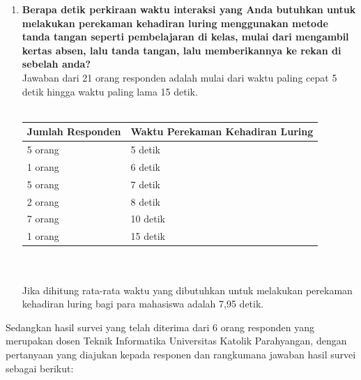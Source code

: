 \begin{enumerate}
	\item \textbf{Berapa detik perkiraan waktu interaksi yang Anda butuhkan untuk melakukan perekaman kehadiran luring menggunakan metode tanda tangan seperti pembelajaran di kelas, mulai dari mengambil kertas absen, lalu tanda tangan, lalu memberikannya ke rekan di sebelah anda?}\\
	Jawaban dari 21 orang responden adalah mulai dari waktu paling cepat 5 detik hingga waktu paling lama 15 detik.\\ \\
	  \begin{tabular}{|p{4cm} |p{7cm}|}
		\hline
		Jumlah Responden &  Waktu Perekaman Kehadiran Luring \\ \hline     
		5 orang &  5 detik\\ \hline 
		1 orang &  6 detik\\ \hline 
		5 orang &  7 detik\\ \hline 
		2 orang &  8 detik\\ \hline 
		7 orang &  10 detik\\ \hline 
		1 orang &  15 detik\\ \hline
	\end{tabular}\\ \\
	Jika dihitung rata-rata waktu yang dibutuhkan untuk melakukan perekaman kehadiran luring bagi para mahasiswa adalah 7,95 detik.
\end{enumerate}
Sedangkan hasil survei yang telah diterima dari 6 orang responden yang merupakan dosen Teknik Informatika Universitas Katolik Parahyangan, dengan pertanyaan yang diajukan kepada responen dan rangkumana jawaban hasil survei sebagai berikut:
